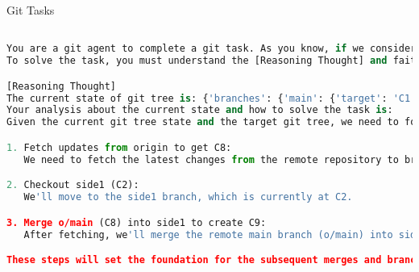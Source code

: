 Git Tasks


\begin{lstlisting}[language=Python]

You are a git agent to complete a git task. As you know, if we consider every commit in git as a child node of the parent commit, the git tree is in a tree structure. You can interact with the git tree through a terminal by git commands.
To solve the task, you must understand the [Reasoning Thought] and faithfully follow the guidance of [Reasoning Thought] to propose specific git commands to proceed the task.

[Reasoning Thought]
The current state of git tree is: {'branches': {'main': {'target': 'C1', 'id': 'main', 'remoteTrackingBranchID': 'o/main'}, 'o/main': {'target': 'C1', 'id': 'o/main', 'remoteTrackingBranchID': None}, 'side1': {'target': 'C2', 'id': 'side1', 'remoteTrackingBranchID': None}, 'side2': {'target': 'C4', 'id': 'side2', 'remoteTrackingBranchID': None}, 'side3': {'target': 'C7', 'id': 'side3', 'remoteTrackingBranchID': None}}, 'commits': {'C0': {'parents': [], 'id': 'C0', 'rootCommit': True}, 'C1': {'parents': ['C0'], 'id': 'C1'}, 'C2': {'parents': ['C1'], 'id': 'C2'}, 'C3': {'parents': ['C1'], 'id': 'C3'}, 'C4': {'parents': ['C3'], 'id': 'C4'}, 'C5': {'parents': ['C1'], 'id': 'C5'}, 'C6': {'parents': ['C5'], 'id': 'C6'}, 'C7': {'parents': ['C6'], 'id': 'C7'}}, 'tags': {}, 'HEAD': {'target': 'side3', 'id': 'HEAD'}, 'originTree': {'branches': {'main': {'target': 'C8', 'id': 'main', 'remoteTrackingBranchID': None}}, 'commits': {'C0': {'parents': [], 'id': 'C0', 'rootCommit': True}, 'C1': {'parents': ['C0'], 'id': 'C1'}, 'C8': {'parents': ['C1'], 'id': 'C8'}}, 'tags': {}, 'HEAD': {'target': 'main', 'id': 'HEAD'}}}.
Your analysis about the current state and how to solve the task is:
Given the current git tree state and the target git tree, we need to follow the proposed plan to achieve the desired result. We're at the beginning of the plan, so we'll start with the first subtask:

1. Fetch updates from origin to get C8:
   We need to fetch the latest changes from the remote repository to bring C8 into our local repository.

2. Checkout side1 (C2):
   We'll move to the side1 branch, which is currently at C2.

3. Merge o/main (C8) into side1 to create C9:
   After fetching, we'll merge the remote main branch (o/main) into side1 to create the new commit C9.

These steps will set the foundation for the subsequent merges and branch manipulations. The specific git commands to accomplish these subtasks are:


\end{lstlisting}

